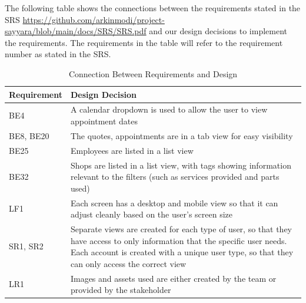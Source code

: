 \documentclass[12pt, titlepage]{article}
\begin{document}
The following table shows the connections between the requirements stated in the SRS
\url{https://github.com/arkinmodi/project-sayyara/blob/main/docs/SRS/SRS.pdf} and our design
decisions to implement the requirements. The requirements in the table will refer to the
requirement number as stated in the SRS.

\begin{table}[H]
	\centering
	\caption{Connection Between Requirements and Design}
	\vspace{5pt}
	\begin{tabular}{|p{}|p{}|}
		\hline
		\textbf{Requirement} & \textbf{Design Decision}                                                                                                                                                                                                    \\
		\hline
		BE4                  & A calendar dropdown is used to allow the user to view appointment dates                                                                                                                                                     \\
		\hline
		BE8, BE20            & The quotes, appointments are in a tab view for easy visibility                                                                                                                                                              \\
		\hline
		BE25                 & Employees are listed in a list view                                                                                                                                                                                         \\
		\hline
		BE32                 & Shops are listed in a list view, with tags showing information relevant to the filters (such as services provided and parts used)                                                                                           \\
		\hline
		LF1                  & Each screen has a desktop and mobile view so that it can adjust cleanly based on the user's screen size                                                                                                                     \\
		\hline
		SR1, SR2             & Separate views are created for each type of user, so that they have access to only information that the specific user needs. Each account is created with a unique user type, so that they can only access the correct view \\
		\hline
		LR1                  & Images and assets used are either created by the team or provided by the stakeholder                                                                                                                                        \\
		\hline
	\end{tabular}
\end{table}
\end{document}
